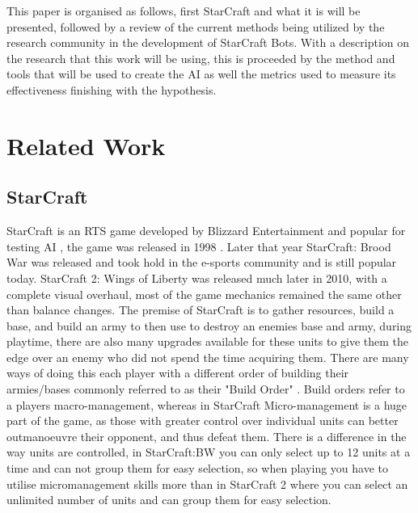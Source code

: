 \documentclass[journal]{IEEEtran}
\begin{document}
This paper is organised as follows, first StarCraft and what it is will be presented, followed by a review of the current methods being utilized by the research community in the development of StarCraft Bots. With a description on the research that this work will be using, this is proceeded by the method and tools that will be used to create the AI as well the metrics used to measure its effectiveness finishing with the hypothesis. 


\section{Related Work}
\subsection{StarCraft}
StarCraft is an RTS game developed by Blizzard Entertainment \cite{Blizzard} and popular for testing AI \cite{Current}, the game was released in 1998 \cite{Release}. Later that year StarCraft: Brood War was released and took hold in the e-sports community and is still popular today. StarCraft 2: Wings of Liberty was released much later in 2010, with a complete visual overhaul, most of the game mechanics remained the same other than balance changes. The premise of StarCraft is to gather resources, build a base, and build an army to then use to destroy an enemies base and army, during playtime, there are also many upgrades available for these units to give them the edge over an enemy who did not spend the time acquiring them. There are many ways of doing this each player with a different order of building their armies/bases commonly referred to as their "Build Order" \cite{BuildOrder}. Build orders refer to a players macro-management, whereas in StarCraft Micro-management is a huge part of the game, as those with greater control over individual units can better outmanoeuvre their opponent, and thus defeat them. There is a difference in the way units are controlled, in StarCraft:BW you can only select up to 12 units at a time and can not group them for easy selection, so when playing you have to utilise micromanagement skills more than in StarCraft 2 where you can select an unlimited number of units and can group them for easy selection.
\end{document}
